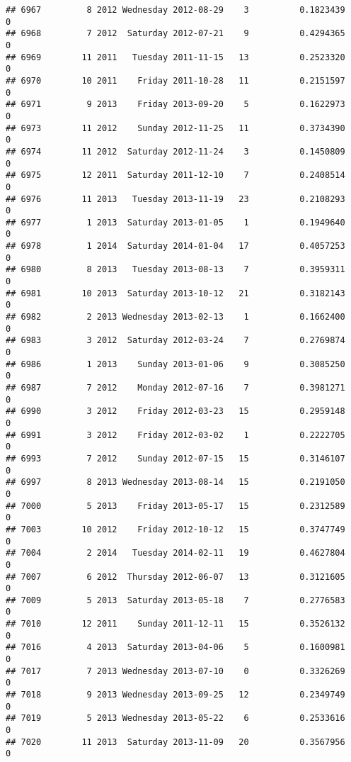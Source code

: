 \documentclass[
]{article}
\begin{document}
\begin{verbatim}
## 6967         8 2012 Wednesday 2012-08-29    3          0.1823439             0
## 6968         7 2012  Saturday 2012-07-21    9          0.4294365             0
## 6969        11 2011   Tuesday 2011-11-15   13          0.2523320             0
## 6970        10 2011    Friday 2011-10-28   11          0.2151597             0
## 6971         9 2013    Friday 2013-09-20    5          0.1622973             0
## 6973        11 2012    Sunday 2012-11-25   11          0.3734390             0
## 6974        11 2012  Saturday 2012-11-24    3          0.1450809             0
## 6975        12 2011  Saturday 2011-12-10    7          0.2408514             0
## 6976        11 2013   Tuesday 2013-11-19   23          0.2108293             0
## 6977         1 2013  Saturday 2013-01-05    1          0.1949640             0
## 6978         1 2014  Saturday 2014-01-04   17          0.4057253             0
## 6980         8 2013   Tuesday 2013-08-13    7          0.3959311             0
## 6981        10 2013  Saturday 2013-10-12   21          0.3182143             0
## 6982         2 2013 Wednesday 2013-02-13    1          0.1662400             0
## 6983         3 2012  Saturday 2012-03-24    7          0.2769874             0
## 6986         1 2013    Sunday 2013-01-06    9          0.3085250             0
## 6987         7 2012    Monday 2012-07-16    7          0.3981271             0
## 6990         3 2012    Friday 2012-03-23   15          0.2959148             0
## 6991         3 2012    Friday 2012-03-02    1          0.2222705             0
## 6993         7 2012    Sunday 2012-07-15   15          0.3146107             0
## 6997         8 2013 Wednesday 2013-08-14   15          0.2191050             0
## 7000         5 2013    Friday 2013-05-17   15          0.2312589             0
## 7003        10 2012    Friday 2012-10-12   15          0.3747749             0
## 7004         2 2014   Tuesday 2014-02-11   19          0.4627804             0
## 7007         6 2012  Thursday 2012-06-07   13          0.3121605             0
## 7009         5 2013  Saturday 2013-05-18    7          0.2776583             0
## 7010        12 2011    Sunday 2011-12-11   15          0.3526132             0
## 7016         4 2013  Saturday 2013-04-06    5          0.1600981             0
## 7017         7 2013 Wednesday 2013-07-10    0          0.3326269             0
## 7018         9 2013 Wednesday 2013-09-25   12          0.2349749             0
## 7019         5 2013 Wednesday 2013-05-22    6          0.2533616             0
## 7020        11 2013  Saturday 2013-11-09   20          0.3567956             0

\end{verbatim}
\end{document}
